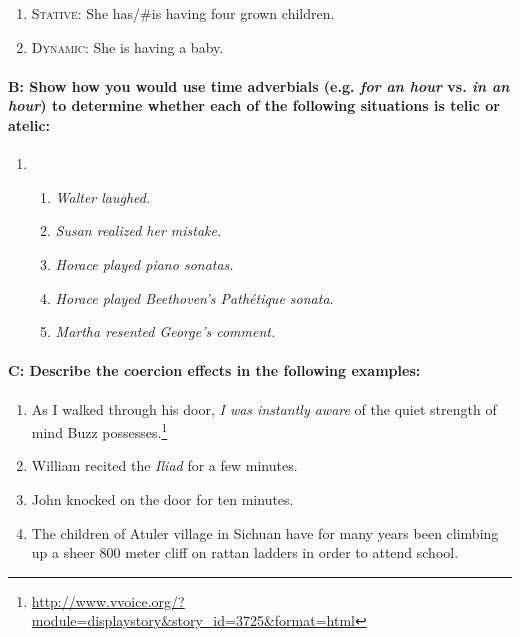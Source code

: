 \begin{enumerate}
\item \textsf{\textsc{Stative}}\textsf{: She has/\#is having four grown children.}
\item \textsf{\textsc{Dynamic}}\textsf{: She is having a baby.}
\end{enumerate}

\paragraph*{B: Show how you would use time adverbials (e.g. \textit{for an hour} vs. \textit{in an hour}) to determine whether each of the following situations is telic or atelic:}

\begin{enumerate}
\item \begin{enumerate}
\item \itshape
Walter laughed.
\item \itshape
Susan realized her mistake.
\item \itshape
Horace played piano sonatas.
\item \textit{Horace played Beethoven’s Pathétique sonata}.
\item \itshape
Martha resented George’s comment.
\end{enumerate}
\end{enumerate}

\paragraph{C: Describe the coercion effects in the following examples:}

\begin{enumerate}[label=\alph*.]
\item  As I walked through his door, \textit{I was instantly aware} of the quiet strength of mind Buzz possesses.\footnote{\url{http://www.vvoice.org/?module=displaystory&story_id=3725&format=html}}
\item William recited the \textit{Iliad} for a few minutes.
\item John knocked on the door for ten minutes.
\item The children of Atuler village in Sichuan have for many years been climbing  up a sheer 800 meter cliff on rattan ladders in order to attend school.
\end{enumerate}